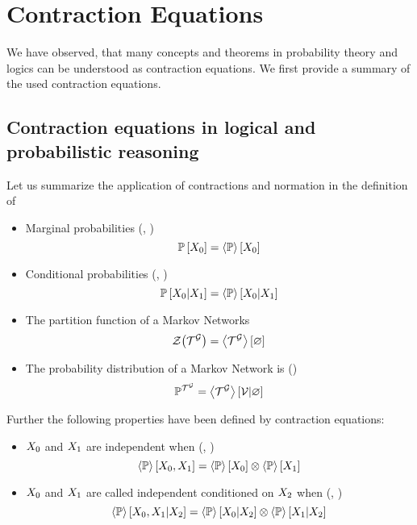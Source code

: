 \section{Contraction Equations}

We have observed, that many concepts and theorems in probability theory and logics can be understood as contraction equations.
We first provide a summary of the used contraction equations.

\subsection{Contraction equations in logical and probabilistic reasoning}

Let us summarize the application of contractions and normation in the definition of
\begin{itemize}
	\item Marginal probabilities (, )
		\[ \mathbb{P}\left[X_{0}\right] = \left\langle \mathbb{P}\right\rangle \left[ X_{0} \right] \]
	\item Conditional probabilities (, )
		\[ \mathbb{P}\left[X_{0}|X_{1}\right] = \left\langle \mathbb{P}\right\rangle \left[ X_{0} | X_{1} \right] \]
	\item The partition function of a Markov Networks 
		\begin{align*}
			\mathcal{Z}{\left(\mathcal{T}^{\mathcal{G}}\right)} = \left\langle \mathcal{T}^{\mathcal{G}}\right\rangle \left[ \varnothing \right]
		\end{align*}
	\item The probability distribution of a Markov Network is ()
		\begin{align*}
			\mathbb{P}^{\mathcal{T}^{\mathcal{G}}} = \left\langle \mathcal{T}^{\mathcal{G}}\right\rangle \left[ \mathcal{V} | \varnothing \right]
		\end{align*}
\end{itemize}


Further the following properties have been defined by contraction equations:
\begin{itemize}
	\item $X_{0}$ and $X_{1}$ are independent when (, )
		\[  \left\langle \mathbb{P}\right\rangle \left[ X_{0},X_{1} \right] 
		=  \left\langle \mathbb{P}\right\rangle \left[ X_{0} \right] 
			\otimes  \left\langle \mathbb{P}\right\rangle \left[ X_{1} \right] \]
	\item $X_{0}$ and $X_{1}$ are called independent conditioned on $X_{2}$ when (, )
		\[ \left\langle \mathbb{P}\right\rangle \left[ X_{0},X_{1} | X_{2} \right] 
		= \left\langle \mathbb{P}\right\rangle \left[ X_{0} | X_{2} \right] 
		\otimes \left\langle \mathbb{P}\right\rangle \left[ X_{1} | X_{2} \right] \]
\end{itemize}






